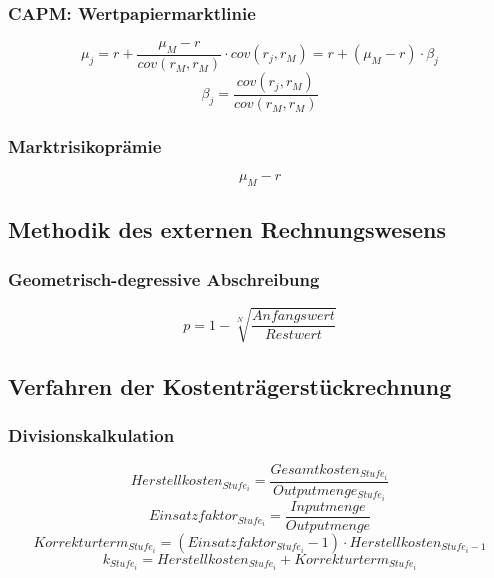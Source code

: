 \subsubsection{CAPM: Wertpapiermarktlinie}
\[\mu_j = r + \frac{\mu_M-r}{cov(r_M,r_M)}\cdot cov(r_j,r_M) = r + (\mu_M-r)\cdot \beta_j\]
\[\beta_j = \frac{cov(r_j,r_M)}{cov(r_M,r_M)}\]

\subsubsection{Marktrisikoprämie}
\[\mu_M - r\]


\subsection{Methodik des externen Rechnungswesens}

\subsubsection{Geometrisch-degressive Abschreibung}
\[p = 1 - \sqrt[N]{\frac{Anfangswert}{Restwert}}\]


\subsection{Verfahren der Kostenträgerstückrechnung}

\subsubsection{Divisionskalkulation}
\[Herstellkosten_{Stufe_i} = \frac{Gesamtkosten_{Stufe_i}}{Outputmenge_{Stufe_i}}\]
\[Einsatzfaktor_{Stufe_i}=\frac{Inputmenge}{Outputmenge}\]
\[Korrekturterm_{Stufe_i} = (Einsatzfaktor_{Stufe_i}-1)\cdot Herstellkosten_{Stufe_i-1}\]
\[k_{Stufe_i} = Herstellkosten_{Stufe_i}+Korrekturterm_{Stufe_i}\]
